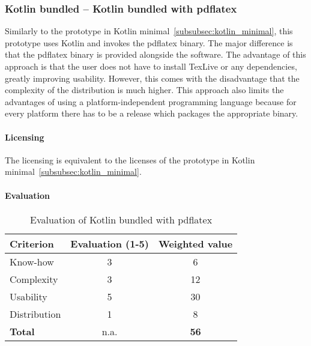\subsubsection{Kotlin bundled – Kotlin bundled with pdflatex}\label{sec:kotlin_bundled}
Similarly to the prototype in Kotlin minimal~\ref{subsubsec:kotlin_minimal}, this prototype uses Kotlin and invokes the pdflatex binary.
The major difference is that the pdflatex binary is provided alongside
the software.
The advantage of this approach is that the user does not have to install TexLive or any dependencies, greatly improving usability.
However, this comes with the disadvantage that the complexity of the distribution is much higher.
This approach also limits the advantages of using a platform-independent programming language because for every platform there has to be a release
which packages the appropriate binary.

\paragraph{Licensing}\mbox{}\newline
The licensing is equivalent to the licenses of the prototype in Kotlin minimal~\ref{subsubsec:kotlin_minimal}.

\paragraph{Evaluation}\mbox{}\newline
\begin{table}[H]
    \centering
    \begin{tabular}{l c c}
        \toprule
        \textbf{Criterion} & \textbf{Evaluation (1{-}5)} & \textbf{Weighted value} \\
        \midrule
        Know-how           & 3                           & 6                       \\
        \midrule
        Complexity         & 3                           & 12                      \\
        \midrule
        Usability          & 5                           & 30                      \\
        \midrule
        Distribution       & 1                           & 8                       \\
        \midrule
        \textbf{Total}     & n.a.                        & \textbf{56}             \\
        \bottomrule
    \end{tabular}
    \caption{Evaluation of Kotlin bundled with pdflatex}\label{table:kotlin_bundled_evaluation}
\end{table}

